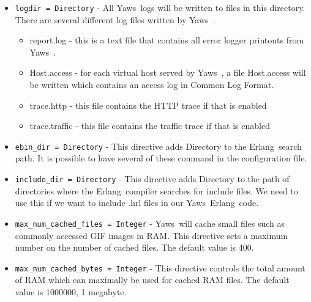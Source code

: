 \documentclass[11pt,oneside,english]{book}
\newcommand{\Erlang}            %
        {{\sc Erlang}}
\newcommand{\Yaws}            %
        {{\sc Yaws}}
\begin{document}
\begin{itemize}


\item       \verb+logdir = Directory+ -
              All \Yaws\  logs will be  written  to  files  in  this
              directory.  There  are  several different log files
              written by \Yaws\ .

              \begin{itemize}
              \item report.log - this is a text file that contains  all
              error logger printouts from \Yaws\ .
              \item Host.access - for each virtual host served by \Yaws\ ,
              a file Host.access will be written  which  contains
              an access log in Common Log Format.
              \item trace.http  -  this file contains the HTTP trace if
              that is enabled
              \item trace.traffic -  this  file  contains  the  traffic
              trace if that is enabled
              \end{itemize}

\item        \verb+ebin_dir = Directory+ -
              This  directive adds Directory to the \Erlang\  search
              path. It is possible to have several of these  command
              in the configuration file.

\item        \verb+include_dir = Directory+ -
              This directive adds Directory to the path of directories
               where  the  \Erlang\   compiler  searches  for
              include  files.  We  need to use this if we want to
              include .hrl files in our \Yaws\  \Erlang\  code.

\item        \verb+max_num_cached_files = Integer+ -
              \Yaws\   will  cache  small  files  such  as  commonly
              accessed  GIF images in RAM.  This directive sets a
              maximum number on the number of cached files.   The
              default value is 400.

\item        \verb+max_num_cached_bytes = Integer+ -
              This  directive  controls  the  total amount of RAM
              which can maximally be used for cached  RAM  files.
              The default value is 1000000, 1 megabyte.


\end{itemize}
\end{document}
